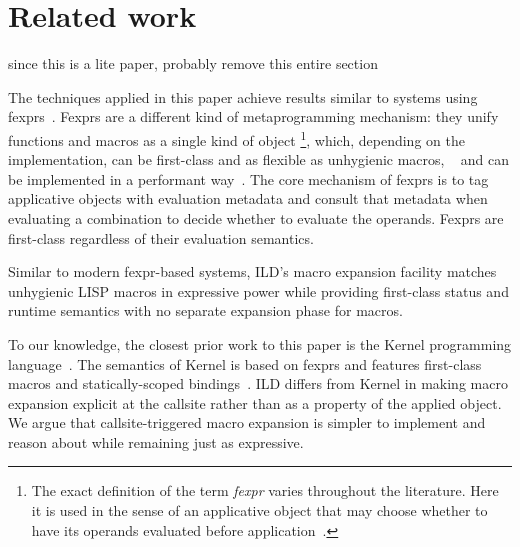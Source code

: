 \section{Related work}
\label{fexpr-comparison}

\begin{note}
since this is a lite paper, probably remove this entire section
\end{note}

The techniques applied in this paper achieve results similar to systems using
fexprs~\cite{fexpr-shutt,kernel-report,fexpr-pe}.
Fexprs are a different kind of metaprogramming mechanism: they unify functions
and macros as a single kind of object%
\footnote{
    The exact definition of the term \emph{fexpr} varies throughout
    the literature. Here it is used in the sense of an applicative object
    that may choose whether to have its operands evaluated before
    application~\cite{fexpr-shutt}.
}, which, depending on the implementation,
can be first-class and as flexible as unhygienic macros,%
~\cite{kohlbecker1986syntactic,fexpr-shutt} and can be implemented
in a performant way~\cite{fexpr-pe}. The core mechanism of fexprs is
to tag applicative objects with evaluation metadata and consult that metadata
when evaluating a combination to decide whether to evaluate the operands.
Fexprs are first-class regardless of their evaluation semantics.%
~\cite{fexpr-shutt,kernel-report}

Similar to modern fexpr-based systems, ILD's macro expansion facility matches
unhygienic LISP macros in expressive power while providing first-class
status and runtime semantics with no separate expansion phase for macros.

To our knowledge, the closest prior work to this paper is the Kernel
programming language~\cite{kernel-report}. The semantics of Kernel is based on
fexprs and features first-class macros and statically-scoped
bindings~\cite{kernel-report,fexpr-shutt}. ILD differs from Kernel in
making macro expansion explicit at the callsite rather than
as a property of the applied object.
We argue that callsite-triggered macro expansion is simpler to implement and
reason about while remaining just as expressive.
